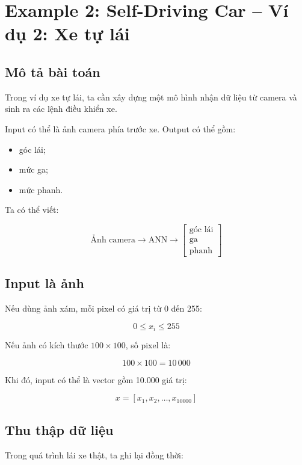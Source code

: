 \section{Example 2: Self-Driving Car -- Ví dụ 2: Xe tự lái}

\subsection{Mô tả bài toán}

Trong ví dụ xe tự lái, ta cần xây dựng một mô hình nhận dữ liệu từ camera và sinh ra các lệnh điều khiển xe.

Input có thể là ảnh camera phía trước xe. Output có thể gồm:

\begin{itemize}
    \item góc lái;
    \item mức ga;
    \item mức phanh.
\end{itemize}

Ta có thể viết:

\[
    \text{Ảnh camera} \rightarrow \text{ANN} \rightarrow
    \begin{bmatrix}
    \text{góc lái}\\
    \text{ga}\\
    \text{phanh}
    \end{bmatrix}
\]

\subsection{Input là ảnh}

Nếu dùng ảnh xám, mỗi pixel có giá trị từ 0 đến 255:

\[
    0 \leq x_i \leq 255
\]

Nếu ảnh có kích thước $100 \times 100$, số pixel là:

\[
    100 \times 100 = 10\,000
\]

Khi đó, input có thể là vector gồm 10.000 giá trị:

\[
    x = [x_1, x_2, \ldots, x_{10000}]
\]

\subsection{Thu thập dữ liệu}

Trong quá trình lái xe thật, ta ghi lại đồng thời:

